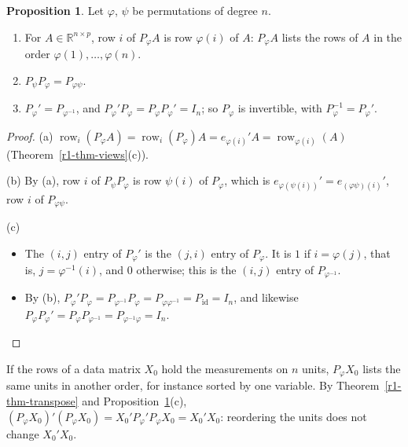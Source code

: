 \documentclass[12pt]{article}
\newcommand{\R}{\mathbb R}
\DeclareMathOperator{\row}{row}
\DeclareMathOperator{\id}{id}
\theoremstyle{definition}
\newtheorem{proposition}[theorem]{Proposition}
\begin{document}
\begin{proposition}\label{r5d-prop-permutation-matrix}
Let \(\varphi\), \(\psi\) be permutations of degree \(n\).
\begin{enumerate}
\item For \(A\in\R^{n\times p}\), row \(i\) of \(P_\varphi A\) is row \(\varphi(i)\) of \(A\): \(P_\varphi A\) lists the rows of
\(A\) in the order \(\varphi(1),\dots,\varphi(n)\).
\item \(P_\psi P_\varphi=P_{\varphi\psi}\).
\item \(P_\varphi'=P_{\varphi^{-1}}\), and \(P_\varphi'P_\varphi=P_\varphi P_\varphi'=I_n\); so \(P_\varphi\) is invertible, with
\(P_\varphi^{-1}=P_\varphi'\).
\end{enumerate}
\end{proposition}
\begin{proof}
(a) \(\row_i(P_\varphi A)=\row_i(P_\varphi)A=e_{\varphi(i)}'A=\row_{\varphi(i)}(A)\) (Theorem~\ref{r1-thm-views}(c)).

(b) By (a), row \(i\) of \(P_\psi P_\varphi\) is row \(\psi(i)\) of \(P_\varphi\), which is
\(e_{\varphi(\psi(i))}'=e_{(\varphi\psi)(i)}'\), row \(i\) of \(P_{\varphi\psi}\).

(c)
\begin{itemize}
\item The \((i,j)\) entry of \(P_\varphi'\) is the \((j,i)\) entry of \(P_\varphi\). It is \(1\) if \(i=\varphi(j)\), that is,
\(j=\varphi^{-1}(i)\), and \(0\) otherwise; this is the \((i,j)\) entry of \(P_{\varphi^{-1}}\).
\item By (b), \(P_\varphi'P_\varphi=P_{\varphi^{-1}}P_\varphi=P_{\varphi\varphi^{-1}}=P_{\id}=I_n\), and likewise
\(P_\varphi P_\varphi'=P_\varphi P_{\varphi^{-1}}=P_{\varphi^{-1}\varphi}=I_n\).\qedhere
\end{itemize}
\end{proof}
If the rows of a data matrix \(X_0\) hold the measurements on \(n\) units, \(P_\varphi X_0\) lists the same units in
another order, for instance sorted by one variable. By Theorem~\ref{r1-thm-transpose} and
Proposition~\ref{r5d-prop-permutation-matrix}(c), \((P_\varphi X_0)'(P_\varphi X_0)=X_0'P_\varphi'P_\varphi X_0=X_0'X_0\):
reordering the units does not change \(X_0'X_0\).
\end{document}
